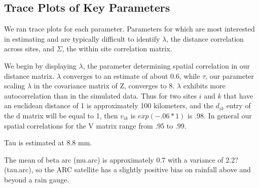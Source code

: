 \documentclass[12pt]{article}
\begin{document}
\subsection{Trace Plots of Key Parameters}

We ran trace plots for each parameter. Parameters for which are most interested in estimating and are typically difficult to identify $\lambda$, the distance correlation across sites, and $\Sigma$, the within site correlation matrix. 






We begin by displaying $\lambda$, the parameter determining spatial correlation in our distance matrix. $\lambda$ converges to an estimate of about 0.6, while $\tau$, our parameter scaling $\lambda$ in the covariance matrix of Z, converges to 8. $\lambda$ exhibits more autocorrelation than in the simulated data. Thus for two sites $i$ and $k$ that have an euclidean distance of 1 is approximately 100 kilometers, and the $d_{ik}$ entry of the d matrix will be equal to 1, then $v_{ik}$ is $exp(-.06*1)$ is .98. In general our spatial correlations for the V matrix range from .95 to .99. 

Tau is estimated at 8.8 mm.

The mean of beta arc (mu.arc) is approximately 0.7 with a  variance of 2.2? (tau.arc), so the ARC satellite has a slightly positive bias on rainfall above and beyond a rain gauge. 





\end{document}
